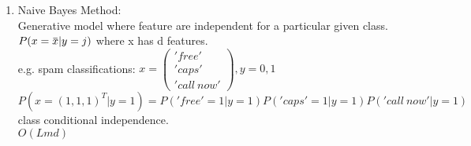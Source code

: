 \documentclass[12pt]{article}
\newcommand{\overbar}[1]{\mkern 1.5mu\overline{\mkern-1.5mu#1\mkern-1.5mu}\mkern 1.5mu}
\begin{document}
\begin{enumerate}
            \item Naive Bayes Method:\\
            Generative model where feature are independent for a particular given class.\\
            $P(x = \overbar{x} | y = j)$ where x has d features.\\
            e.g. spam classifications: $ x = \begin{pmatrix}
                'free' \\ 'caps' \\ 'call \ now'
            \end{pmatrix}, y = 0,1$\\
            $P(x = (1,1,1)^T | y = 1) = P('free' = 1 | y = 1)P('caps' = 1| y = 1)P('call \ now' | y = 1)$\\
            class conditional independence.\\
            $O(Lmd)$
        \end{enumerate}

        \newpage

    
\end{document}
